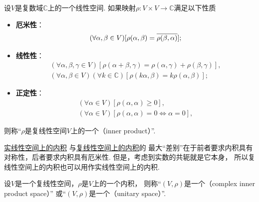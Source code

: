 \begin{definition}\label{definition:酉空间.复线性空间上的内积}
设\(V\)是复数域\(\mathbb{C}\)上的一个线性空间.
如果映射\(\rho\colon V \times V \to \mathbb{C}\)满足以下性质\begin{itemize}
	\item {\rm\bf 厄米性}：\begin{equation*}
		(\forall \alpha,\beta \in V)
		[
			\rho(\alpha,\beta)
			= \overline{\rho(\beta,\alpha)}
		];
	\end{equation*}

	\item {\rm\bf 线性性}：\begin{gather*}
		(\forall \alpha,\beta,\gamma \in V)
		[
			\rho(\alpha+\beta,\gamma)
			= \rho(\alpha,\gamma) + \rho(\beta,\gamma)
		], \\
		(\forall \alpha,\beta \in V)
		(\forall k \in \mathbb{C})
		[
			\rho(k\alpha,\beta)
			= k\rho(\alpha,\beta)
		];
	\end{gather*}

	\item {\rm\bf 正定性}：\begin{gather*}
		(\forall \alpha \in V)
		[
			\rho(\alpha,\alpha) \geq 0
		], \\
		(\forall \alpha \in V)
		[
			\rho(\alpha,\alpha) = 0
			\iff
			\alpha = 0
		],
	\end{gather*}
\end{itemize}
则称“\(\rho\)是复线性空间\(V\)上的一个（inner product）”.
\end{definition}
\begin{remark}
\hyperref[definition:欧几里得空间.实线性空间上的内积]{实线性空间上的内积}%
与\hyperref[definition:酉空间.复线性空间上的内积]{复线性空间上的内积}的
最大“差别”在于前者要求内积具有对称性，后者要求内积具有厄米性.
但是，考虑到实数的共轭就是它本身，
所以复线性空间上的内积也可以用作实线性空间上的内积.
\end{remark}

\begin{definition}
设\(V\)是一个复线性空间，\(\rho\)是\(V\)上的一个内积，
则称“\((V,\rho)\)是一个（complex inner product space）”
或“\((V,\rho)\)是一个（unitary space）”.
\end{definition}

